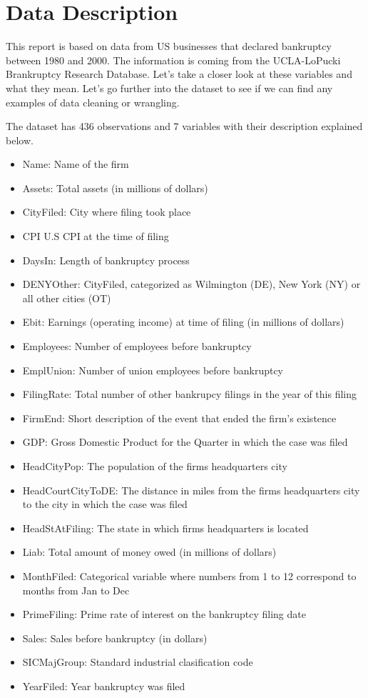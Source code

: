 \documentclass[
]{article}
\providecommand{\tightlist}{%
  \setlength{\itemsep}{0pt}\setlength{\parskip}{0pt}}
\begin{document}
\pagebreak

\hypertarget{data-description}{%
\section{Data Description}\label{data-description}}

This report is based on data from US businesses that declared bankruptcy between 1980 and 2000. The information is coming from the UCLA-LoPucki Brankruptcy Research Database. Let's take a closer look at these variables and what they mean. Let's go further into the dataset to see if we can find any examples of data cleaning or wrangling.

The dataset has 436 observations and 7 variables with their description explained below.

\begin{itemize}
\tightlist
\item
  Name: Name of the firm
\item
  Assets: Total assets (in millions of dollars)
\item
  CityFiled: City where filing took place
\item
  CPI U.S CPI at the time of filing
\item
  DaysIn: Length of bankruptcy process
\item
  DENYOther: CityFiled, categorized as Wilmington (DE), New York (NY) or all other cities (OT)
\item
  Ebit: Earnings (operating income) at time of filing (in millions of dollars)
\item
  Employees: Number of employees before bankruptcy
\item
  EmplUnion: Number of union employees before bankruptcy
\item
  FilingRate: Total number of other bankrupcy filings in the year of this filing
\item
  FirmEnd: Short description of the event that ended the firm's existence
\item
  GDP: Gross Domestic Product for the Quarter in which the case was filed
\item
  HeadCityPop: The population of the firms headquarters city
\item
  HeadCourtCityToDE: The distance in miles from the firms headquarters city to the city in which
  the case was filed
\item
  HeadStAtFiling: The state in which firms headquarters is located
\item
  Liab: Total amount of money owed (in millions of dollars)
\item
  MonthFiled: Categorical variable where numbers from 1 to 12 correspond to months from Jan to Dec
\item
  PrimeFiling: Prime rate of interest on the bankruptcy filing date
\item
  Sales: Sales before bankruptcy (in dollars)
\item
  SICMajGroup: Standard industrial clasification code
\item
  YearFiled: Year bankruptcy was filed
\end{itemize}
\end{document}
